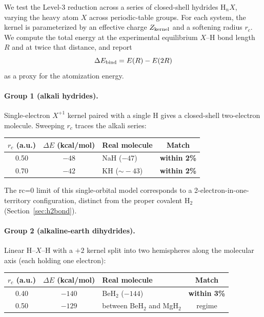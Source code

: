 \documentclass[11pt]{article}
\begin{document}
We test the Level-3 reduction across a series of closed-shell hydrides $\mathrm{H}_n X$, varying the heavy atom $X$ across periodic-table groups. For each system, the kernel is parameterized by an effective charge $Z_{\rm kernel}$ and a softening radius $r_c$. We compute the total energy at the experimental equilibrium $X$--H bond length $R$ and at twice that distance, and report
\[
\Delta E_{\rm bind} = E(R) - E(2R)
\]
as a proxy for the atomization energy.

\paragraph{Group 1 (alkali hydrides).}
Single-electron $X^{+1}$ kernel paired with a single H gives a closed-shell two-electron molecule. Sweeping $r_c$ traces the alkali series:

\begin{center}
\begin{tabular}{c c l c}
\toprule
$r_c$ (a.u.) & $\Delta E$ (kcal/mol) & Real molecule & Match \\
\midrule
0.50 & $-48$ & NaH ($-47$) & \textbf{within 2\%} \\
0.70 & $-42$ & KH ($\sim\!-43$) & \textbf{within 2\%} \\
\bottomrule
\end{tabular}
\end{center}
The rc=0 limit of this single-orbital model corresponds to a 2-electron-in-one-territory configuration, distinct from the proper covalent H$_2$ (Section~\ref{sec:h2bond}).

\paragraph{Group 2 (alkaline-earth dihydrides).}
Linear H--$X$--H with a $+2$ kernel split into two hemispheres along the molecular axis (each holding one electron):

\begin{center}
\begin{tabular}{c c l c}
\toprule
$r_c$ (a.u.) & $\Delta E$ (kcal/mol) & Real molecule & Match \\
\midrule
0.40 & $-140$ & BeH$_2$ ($-144$) & \textbf{within 3\%} \\
0.50 & $-129$ & between BeH$_2$ and MgH$_2$ & regime \\
\bottomrule
\end{tabular}
\end{center}
\end{document}
